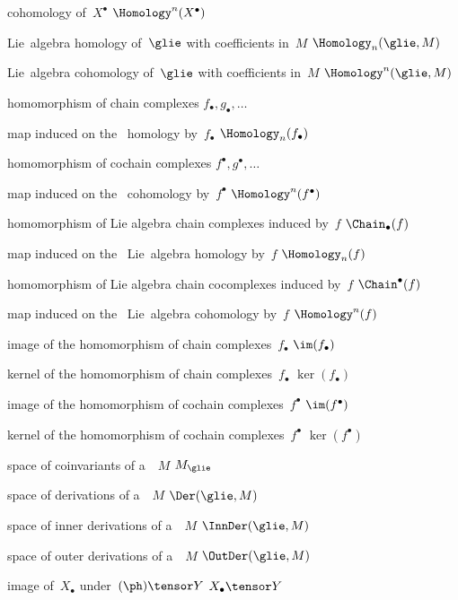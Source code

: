 { cohomology of~$X^\bullet$}
{$\Homology^n(X^\bullet)$}

{ Lie~algebra homology of~$\glie$ with coefficients in~$M$}
{$\Homology_n(\glie, M)$}

{ Lie~algebra cohomology of~$\glie$ with coefficients in~$M$}
{$\Homology^n(\glie, M)$}

{homomorphism of chain complexes}
{$f_\bullet, g_\bullet, \dotsc$}

{map induced on the~ homology by~$f_\bullet$}
{$\Homology_n(f_\bullet)$}

{homomorphism of cochain complexes}
{$f^\bullet, g^\bullet, \dotsc$}

{map induced on the~ cohomology by~$f^\bullet$}
{$\Homology^n(f^\bullet)$}

{homomorphism of Lie algebra chain complexes induced by~$f$}
{$\Chain_\bullet(f)$}

{map induced on the~ Lie~algebra homology by~$f$}
{$\Homology_n(f)$}

{homomorphism of Lie algebra chain cocomplexes induced by~$f$}
{$\Chain^\bullet(f)$}

{map induced on the~ Lie~algebra cohomology by~$f$}
{$\Homology^n(f)$}

{image of the homomorphism of chain complexes~$f_\bullet$}
{$\im(f_\bullet)$}

{kernel of the homomorphism of chain complexes~$f_\bullet$}
{$\ker(f_\bullet)$}

{image of the homomorphism of cochain complexes~$f^\bullet$}
{$\im(f^\bullet)$}

{kernel of the homomorphism of cochain complexes~$f^\bullet$}
{$\ker(f^\bullet)$}

{space of coinvariants of a~\representation{$\glie$}~$M$}
{$M_{\glie}$}

{space of derivations of a~\representation{$\glie$}~$M$}
{$\Der(\glie, M)$}

{space of inner derivations of a~\representation{$\glie$}~$M$}
{$\InnDer(\glie, M)$}

{space of outer derivations of a~\representation{$\glie$}~$M$}
{$\OutDer(\glie, M)$}

{image of~$X_\bullet$ under~$(\ph) \tensor Y$}
{$X_\bullet \tensor Y$}
